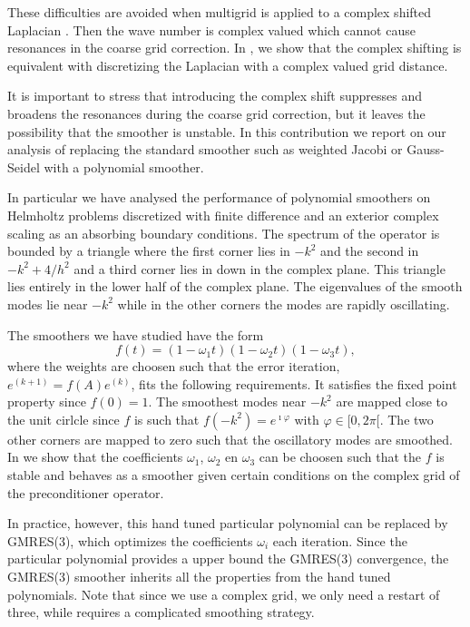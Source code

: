 \documentclass{report}
\begin{document}
These difficulties are avoided when multigrid is applied to a complex
shifted Laplacian \cite{EVO06,EVO}. Then the wave number is complex
valued which cannot cause resonances in the coarse grid correction.
In \cite{JCP-paper}, we show that the complex shifting is equivalent with
discretizing the Laplacian with a complex valued grid distance.

It is important to stress that introducing the complex shift
suppresses and broadens the resonances during the coarse grid
correction, but it leaves the possibility that the smoother is
unstable. In this contribution we report on our analysis of replacing
the standard smoother such as weighted Jacobi or Gauss-Seidel with a
polynomial smoother.

In particular we have analysed the performance of polynomial
smoothers \cite{siam} on Helmholtz problems discretized with finite
difference and an exterior complex scaling as an absorbing boundary
conditions. The spectrum of the operator is bounded by a
triangle \cite{JCP-paper} where the first corner lies in $-k^2$ and
the second in $-k^2+4/h^2$ and a third corner lies in down in the
complex plane. This triangle lies entirely in the lower half of the
complex plane. The eigenvalues of the smooth modes lie near $-k^2$ while
in the other corners the modes are rapidly oscillating.

The smoothers we have studied have the form
\begin{equation}
f(t) = (1 -\omega_1 t) (1 -\omega_2 t)(1 -\omega_3 t),
\end{equation}
where the weights are choosen such that the error iteration,
$e^{(k+1)} = f(A) e^{(k)}$, fits the following requirements. It
satisfies the fixed point property since $f(0)=1$. The smoothest
modes near $-k^2$ are mapped close to the unit cirlcle since $f$ is
such that $f(-k^2)=e^{\imath\varphi}$ with $\varphi \in [0,2\pi[$. The
two other corners are
mapped to zero such that the oscillatory modes are
smoothed. In \cite{siam} we show that the coefficients $\omega_1$,
$\omega_2$ en $\omega_3$ can be choosen such that the $f$ is stable and
behaves as a smoother given certain conditions on the complex grid of
the preconditioner operator.

In practice, however, this hand tuned particular polynomial can be
replaced by GMRES(3), which optimizes the coefficients $\omega_i$ each
iteration. Since the particular polynomial provides a upper bound the
GMRES(3) convergence, the GMRES(3) smoother inherits all the
properties from the hand tuned polynomials. Note that since we use a
complex grid, we only need a restart of three, while \cite{elman}
requires a complicated smoothing strategy.
\end{document}
